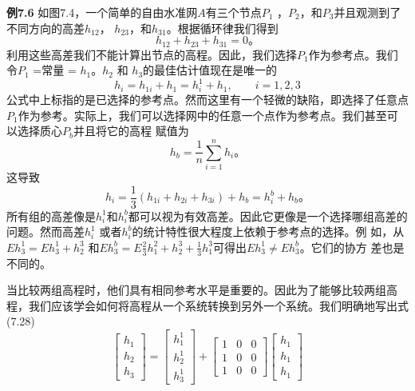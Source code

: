 \par\noindent
\textbf{例7.6} 如图7.4，一个简单的自由水准网$A$有三个节点$P_1$ ，$P_2$，和$P_3$并且观测到了不同方向的高差$h_{12}$， $h_{23}$，和$h_{31}$。根据循环律我们得到
\begin{equation}
	h_{12} + h_{23} + h_{31} = 0 \text{。}
\end{equation}
利用这些高差我们不能计算出节点的高程。因此，我们选择$P_1$作为参考点。我们令$P_1$ =常量 = $h_1$。$h_2$ 和 $h_3$的最佳估计值现在是唯一的
\begin{equation}
	h_{i} = h_{1i} + h_{1} = h_{i}^{1} + h_1,\qquad i = 1,2,3
\end{equation}
公式中上标指的是已选择的参考点。然而这里有一个轻微的缺陷，即选择了任意点$P_1$作为参考。实际上，我们可以选择网中的任意一个点作为参考点。我们甚至可以选择质心$P_b$并且将它的高程
赋值为\begin{equation*}
	h_{b} = \frac{1}{n}\sum_{i = 1}^{n}h_i \text{。}
\end{equation*}
这导致
\begin{equation*}
	h_{i} = \frac{1}{3}(h_{1i} + h_{2i} + h_{3i}) + h_b = h_{i}^{b} + h_b \text{。}
\end{equation*}
所有组的高差像是$h_{i}^{1}$和$h_{i}^{b}$都可以视为有效高差。因此它更像是一个选择哪组高差的问题。然而高差$h_{i}^{1}$ 或者$h_{i}^{b}$的统计特性很大程度上依赖于参考点的选择。例
如，从$E{h_{3}^{1}} = E{h_{3}^{1} + h_{2}^{3}}$ 和$E{h_{3}^{b}} = E{\frac{2}{3}h_{1}^{2} + h_{2}^{3} + \frac{1}{3}h_{1}^{3}}$可得出$E{h_{3}^{1}} \neq E{h_{3}^{b}}$。它们的协方
差也是不同的。
\par
当比较两组高程时，他们具有相同参考水平是重要的。因此为了能够比较两组高程，我们应该学会如何将高程从一个系统转换到另外一个系统。我们明确地写出式(7.28)
\begin{equation}
	\begin{bmatrix}
		h_{1}\\
		h_{2}\\
		h_{3}
	\end{bmatrix}
	= \begin{bmatrix}
		h_{1}^{1}\\
		h_{2}^{1}\\
		h_{3}^{1}
	\end{bmatrix}
	+ \begin{bmatrix}
		1 & 0 & 0\\
		1 & 0 & 0\\
		1 & 0 & 0
	\end{bmatrix}
	\begin{bmatrix}
		h_{1}\\
		h_{1}\\
		h_{1}
	\end{bmatrix}
\end{equation}
